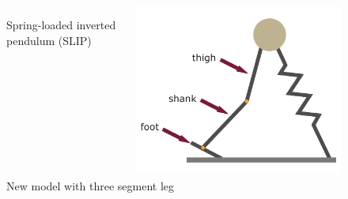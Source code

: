\documentclass[10pt]{beamer}
\begin{document}
\begin{frame}
\begin{figure}
\begin{overprint}
\begin{columns}
\begin{column}{.5\textwidth}
				\caption{Spring-loaded inverted pendulum (SLIP)}				
			\end{column}
			\begin{column}{.5\textwidth}
				\centering
				\includegraphics[height=.5\textheight]{images/new_model/left_3leg.pdf} 
				\caption{New model with three segment leg}				
			\end{column}
		\end{columns}


\end{overprint}
\end{figure}
\end{frame}
\end{document}
